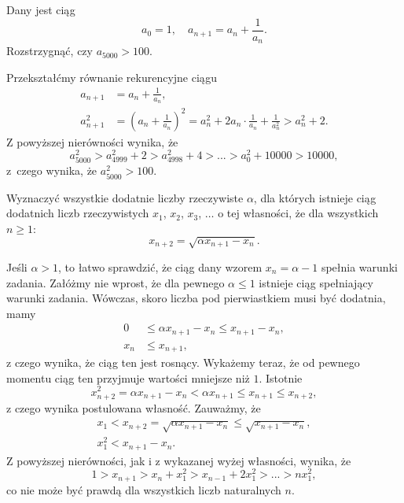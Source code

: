 \vspace{5px}

\begin{problem}{5}
	Dany jest ciąg
	\[
		a_0 = 1, \quad a_{n + 1} = a_n + \frac{1}{a_n}.
	\]
	Rozstrzygnąć, czy $a_{5000} > 100$.
\end{problem}


\noindent
Przekształćmy równanie rekurencyjne ciągu
\begin{align*}
	a_{n + 1} &= a_n + \frac{1}{a_n}, \\
	a_{n + 1}^2 &= \left(a_n + \frac{1}{a_n}\right)^2 = a_n^2 + 2 a_n \cdot \frac{1}{a_n} + \frac{1}{a_n^2}  > a_n^2 + 2.
\end{align*}
Z powyższej nierówności wynika, że
\[
	a_{5000}^2 > a_{4999}^2 + 2 > a_{4998}^2 + 4 > ... > a_0^2 + 10000 > 10000, 
\]
z~czego wynika, że $a_{5000}^2 > 100$.

\vspace{5px}

\begin{problem}{6}
	Wyznaczyć wszystkie dodatnie liczby rzeczywiste $\alpha$, dla których istnieje ciąg dodatnich liczb rzeczywistych $x_1$, $x_2$, $x_3$, $\dots$ o tej własności, że dla wszystkich $n\geqslant 1$:
	\[
		x_{n+2} = \sqrt{\alpha x_{n+1} - x_n}.
	\]
\end{problem}


\noindent
Jeśli $\alpha > 1$, to łatwo sprawdzić, że ciąg dany wzorem $x_n  = \alpha - 1$ spełnia warunki zadania. Załóżmy nie wprost, że dla pewnego $\alpha \leqslant 1$ istnieje ciąg spełniający warunki zadania. Wówczas, skoro liczba pod pierwiastkiem musi być dodatnia, mamy
\begin{align*}
 	0 &\leqslant \alpha x_{n+1} - x_n \leqslant x_{n + 1} - x_n, \\
 	x_n &\leqslant x_{n + 1},
\end{align*}
z czego wynika, że ciąg ten jest rosnący. Wykażemy teraz, że od pewnego momentu ciąg ten przyjmuje wartości mniejsze niż $1$. Istotnie
\[
	x_{n + 2}^2 = \alpha x_{n + 1} - x_n < \alpha x_{n + 1} \leqslant x_{n + 1} \leqslant x_{n + 2},
\]
z czego wynika postulowana własność.
Zauważmy, że
\begin{align*}
	x_1 < x_{n + 2} = \sqrt{\alpha x_{n+1} - x_n} \leqslant \sqrt{x_{n+1} - x_n}, \\
	x_1^2 < x_{n+1} - x_n.
\end{align*}
Z powyższej nierówności, jak i z wykazanej wyżej własności, wynika, że
\[
	1 > x_{n + 1} > x_n + x_{1}^2 > x_{n - 1} + 2x_{1}^2 > ... > nx_{1}^2,
\]
co nie może być prawdą dla wszystkich liczb naturalnych $n$.

